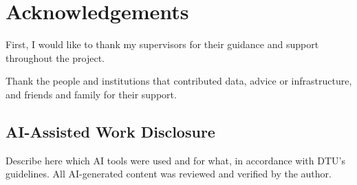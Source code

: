 \chapter*{Acknowledgements}

First, I would like to thank my supervisors for their guidance and support
throughout the project.

Thank the people and institutions that contributed data, advice or
infrastructure, and friends and family for their support.

\section*{AI-Assisted Work Disclosure}
Describe here which AI tools were used and for what, in accordance with DTU's
guidelines. All AI-generated content was reviewed and verified by the author.
